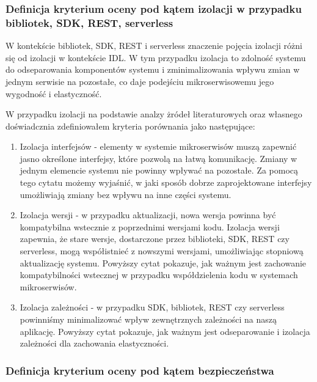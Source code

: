 \documentclass[runningheads,12pt]{llncs}
\begin{document}
\subsubsection{Definicja kryterium oceny pod kątem izolacji w przypadku bibliotek, SDK, REST, serverless}

W kontekście bibliotek, SDK, REST i serverless znaczenie pojęcia izolacji różni się od izolacji w kontekście IDL. W tym przypadku izolacja to zdolność systemu do odseparowania komponentów systemu i zminimalizowania wpływu zmian w jednym serwisie na pozostałe, co daje podejściu mikroserwisowemu jego wygodność i elastyczność.

W przypadku izolacji na podstawie analzy żródeł literaturowych oraz własnego doświadcznia zdefiniowałem kryteria porównania jako następujące:

\begin{enumerate}
    \item Izolacja interfejsów - elementy w systemie mikroserwisów muszą zapewnić jasno określone interfejsy, które pozwolą na łatwą komunikację. Zmiany w jednym elemencie systemu nie powinny wpływać na pozostałe.
    Za pomocą tego cytatu możemy wyjaśnić, w jaki sposób dobrze zaprojektowane interfejsy umożliwiają zmiany bez wpływu na inne części systemu. ~\cite[p. 75]{bloch2018effective}
    \item Izolacja wersji - w przypadku aktualizacji, nowa wersja powinna być kompatybilna wstecznie z poprzednimi wersjami kodu. Izolacja wersji zapewnia, że stare wersje, dostarczone przez biblioteki, SDK, REST czy serverless, mogą współistnieć z nowszymi wersjami, umożliwiając stopniową aktualizację systemu.
    Powyższy cytat pokazuje, jak ważnym jest zachowanie kompatybilności wstecznej w przypadku współdzielenia kodu w systemach mikroserwisów. ~\cite[p. 172]{fowler2012patterns}
    \item Izolacja zależności - w przypadku SDK, bibliotek, REST czy serverless powinniśmy minimalizować wpływ zewnętrznych zależności na naszą aplikację.
    Powyższy cytat pokazuje, jak ważnym jest odseparowanie i izolacja zależności dla zachowania elastyczności. ~\cite[p. 218]{martin2008clean}
\end{enumerate}

\subsubsection{Definicja kryterium oceny pod kątem bezpieczeństwa}
\end{document}
